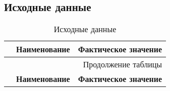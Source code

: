 \subsection{Исходные данные}
\begin{longtable}[h]{|p{}|p{}|p{}|}
  \caption{Исходные данные}
  \\ \hline
	  \textbf{\No}                  &
	  \textbf{Наименование}         &
	  \textbf{Фактическое значение}
	\\ \hline
  \endfirsthead

  \multicolumn{3}{r}{Продолжение таблицы \thetable{}}
  \\ \hline
	  \textbf{\No}                  &
	  \textbf{Наименование}         &
	  \textbf{Фактическое значение}
	\\ \hline
  \endhead


\end{longtable}

